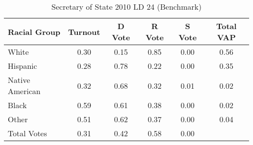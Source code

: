\begin{table}[htb]
\begin{center}
\caption{Secretary of State 2010 LD 24 (Benchmark)}
\label{sos10_vap_ld_24_benchmark}
\begin{tabular}{lccccc}
  \hline
Racial Group & Turnout & D Vote & R Vote & S Vote & Total VAP \\ 
  \hline
White & 0.30 & 0.15 & 0.85 & 0.00 & 0.56 \\ 
  Hispanic & 0.28 & 0.78 & 0.22 & 0.00 & 0.35 \\ 
  Native American & 0.32 & 0.68 & 0.32 & 0.01 & 0.02 \\ 
  Black & 0.59 & 0.61 & 0.38 & 0.00 & 0.02 \\ 
  Other & 0.51 & 0.62 & 0.37 & 0.00 & 0.04 \\ 
  Total Votes & 0.31 & 0.42 & 0.58 & 0.00 &  \\ 
   \hline
\end{tabular}
\end{center}
\end{table}
